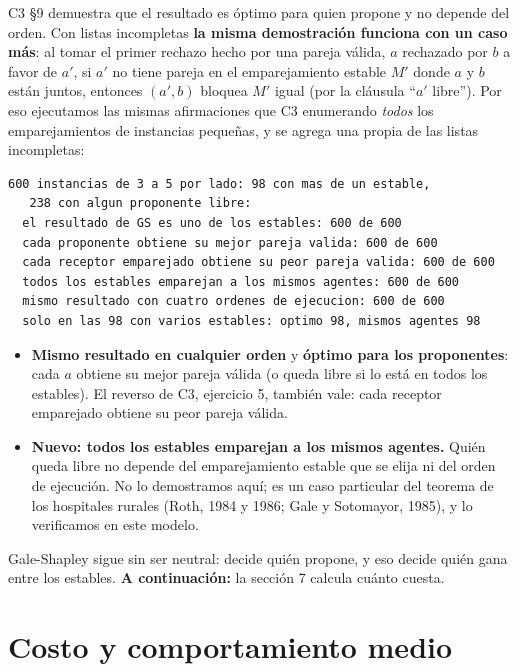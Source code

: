\documentclass[11pt]{article}
\begin{document}
C3 §9 demuestra que el resultado es óptimo para quien propone y no depende del orden. Con listas incompletas
\textbf{la misma demostración funciona con un caso más}: al tomar el primer rechazo hecho por una pareja válida,
$a$ rechazado por $b$ a favor de $a'$, si $a'$ no tiene pareja en el emparejamiento estable $M'$ donde $a$ y $b$
están juntos, entonces $(a',b)$ bloquea $M'$ igual (por la cláusula ``$a'$ libre''). Por eso ejecutamos las
mismas afirmaciones que C3 enumerando \emph{todos} los emparejamientos de instancias pequeñas, y se agrega una
propia de las listas incompletas:
\begin{lstlisting}[style=salida,basicstyle=\ttfamily\footnotesize\color{black},columns=fixed]
600 instancias de 3 a 5 por lado: 98 con mas de un estable,
   238 con algun proponente libre:
  el resultado de GS es uno de los estables: 600 de 600
  cada proponente obtiene su mejor pareja valida: 600 de 600
  cada receptor emparejado obtiene su peor pareja valida: 600 de 600
  todos los estables emparejan a los mismos agentes: 600 de 600
  mismo resultado con cuatro ordenes de ejecucion: 600 de 600
  solo en las 98 con varios estables: optimo 98, mismos agentes 98
\end{lstlisting}
\begin{itemize}[leftmargin=14pt,itemsep=2pt]
\item \textbf{Mismo resultado en cualquier orden} y \textbf{óptimo para los proponentes}: cada $a$ obtiene su mejor
pareja válida (o queda libre si lo está en todos los estables). El reverso de C3, ejercicio 5, también vale:
cada receptor emparejado obtiene su peor pareja válida.
\item \textbf{Nuevo: todos los estables emparejan a los mismos agentes.} Quién queda libre no depende del
emparejamiento estable que se elija ni del orden de ejecución. No lo demostramos aquí; es un caso particular del
teorema de los hospitales rurales (Roth, 1984 y 1986; Gale y Sotomayor, 1985), y lo verificamos en este modelo.
\end{itemize}
Gale-Shapley sigue sin ser neutral: decide quién propone, y eso decide quién gana entre los estables.
\textbf{A continuación:} la sección 7 calcula cuánto cuesta.

\section{Costo y comportamiento medio}
\end{document}
